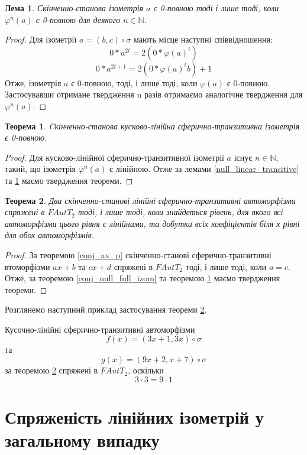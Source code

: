 \documentclass[a4paper,12pt]{article} \usepackage{a4wide}
\numberwithin{equation}{subsection}
\newtheorem{theorem}{Теорема}[subsection]
\newtheorem{lemma}{Лема}[subsection]
\begin{document}
\begin{lemma}\label{varphi_n_zero_full}
  Скінченно-станова ізометрія $a$ є 0-повною тоді і лише тоді, коли
  $\varphi^n(a)$ є 0-повною для деякого $n \in \mathbb{N}$.
\end{lemma}
\begin{proof}
  Для ізометрії $a = (b,c)\circ \sigma$ мають місце наступні
  співвідношення:
  $$0*a^{2t}=2(0*\varphi(a)^t)$$
  $$0*a^{2t+1}=2(0*\varphi(a)^tb)+1$$
  Отже, ізометрія $a$  є 0-повною, тоді, і лише тоді, коли $\varphi(a)$ 
  є 0-повною. Застосувавши отримане твердження n разів отримаємо
  аналогічне твердження для $\varphi^n(a)$.
\end{proof}

\begin{theorem}\label{null_full_linear_transitive}
  Cкінченно-станова кусково-лінійна сферично-транзитивна ізометрія є
  0-повною.
\end{theorem}
\begin{proof}
  Для кусково-лінійної сферично-транзитивної ізометрії $a$ існує
  $n\in\mathbb{N}$, такий, що ізометрія $\varphi^n(a)$ є лінійною.
  Отже за лемами \ref{null_linear_transitive} та
  \ref{varphi_n_zero_full} маємо твердження теореми.
\end{proof}


\begin{theorem}\label{sph_tr_part_lin_conj}
  Два скінченно-станові лінійні сферично-транзитивні автоморфізми
  спряжені в $FAutT_2$ тоді, і лише тоді, коли знайдеться рівень, для
  якого всі автоморфізми цього рівня є лінійними, та добутки всіх
  коефіцієнтів біля х рівні для обох автоморфізмів.
\end{theorem}
\begin{proof}
  За теоремою \ref{conj_ax_p} скінченно-станові сферично-транзитивні втоморфізми $ax+b$ та $cx+d$ спряжені в
  $FAutT_2$ тоді, і лише тоді, коли $a=c$. Отже, за теоремою
  \ref{conj_null_full_izom} та теоремою
  \ref{null_full_linear_transitive} маємо твердження теореми.
\end{proof}

Розглянемо наступний приклад застосування теореми \ref{sph_tr_part_lin_conj}.

Кусочно-лінійні сферично-транзитивні автоморфізми $$f(x)= (3x +1, 3x
)\circ \sigma $$ та $$g(x)= (9x+2 , x+7 )\circ \sigma $$ за теоремою
\ref{sph_tr_part_lin_conj} спряжені в $FAutT_2$, оскільки
$$3\cdot 3 = 9\cdot 1$$


 \section{Спряженість лінійних ізометрій у загальному випадку}
\end{document}
